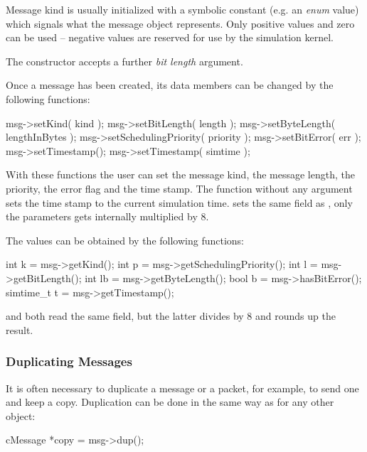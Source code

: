 Message kind is usually initialized with a symbolic constant
(e.g. an \textit{enum} value) which signals what the message object
represents. Only positive values and zero can be used --
negative values are reserved for use by the simulation kernel.

The  constructor accepts a further \textit{bit length} argument.


Once a message has been created, its data members can be changed by the following functions:

\begin{cpp}
msg->setKind( kind );
msg->setBitLength( length );
msg->setByteLength( lengthInBytes );
msg->setSchedulingPriority( priority );
msg->setBitError( err );
msg->setTimestamp();
msg->setTimestamp( simtime );
\end{cpp}

With these functions the user can set the message
kind, the message length,
the priority, the error
flag and the time stamp. The  function without any argument
sets the time stamp to the current simulation time.
 sets the same field as ,
only the parameters gets internally multiplied by 8.

The values can be obtained by the following functions:

\begin{cpp}
int k       = msg->getKind();
int p       = msg->getSchedulingPriority();
int l       = msg->getBitLength();
int lb      = msg->getByteLength();
bool b      = msg->hasBitError();
simtime_t t = msg->getTimestamp();
\end{cpp}

 and  both read the same
field, but the latter divides by 8 and rounds up the result.


\subsubsection{Duplicating Messages}

It is often necessary to duplicate a message or a packet, for example,
to send one and keep a copy. Duplication can be done in the same way as
for any other {\opp} object:

\begin{cpp}
cMessage *copy = msg->dup();
\end{cpp}


